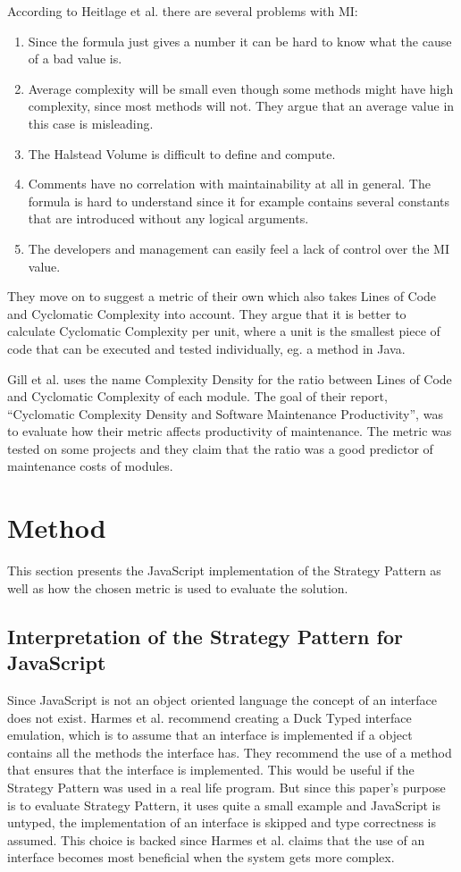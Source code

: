 \documentclass[conference, a4paper]{IEEEtran}
\begin{document}
According to Heitlage et al. there are several problems with MI:
	\begin{enumerate}
		\item Since the formula just gives a number it can be hard to know what the cause of a bad value is.
		\item Average complexity will be small even though some methods might have high complexity, since most methods will not. They argue that an average value in this case is misleading.
		\item The Halstead Volume is difficult to define and compute.
		\item Comments have no correlation with maintainability at all in general. The formula is hard to understand since it for example contains several constants that are introduced without any logical arguments.
		\item The developers and management can easily feel a lack of control over the MI value.
	\end{enumerate}
They move on to suggest a metric of their own which also takes Lines of Code and Cyclomatic Complexity into account. They argue that it is better to calculate Cyclomatic Complexity per unit, where a unit is the smallest piece of code that can be executed and tested individually, eg. a method in Java.~\cite{bibitem:Maintainability}

Gill et al. uses the name Complexity Density for the ratio between Lines of Code and Cyclomatic Complexity of each module. The goal of their report, ``Cyclomatic Complexity Density and Software Maintenance Productivity'', was to evaluate how their metric affects productivity of maintenance. The metric was tested on some projects and they claim that the ratio was a good predictor of maintenance costs of modules.~\cite{bibitem:CCD}

\section{Method}
This section presents the JavaScript implementation of the Strategy Pattern as well as how the chosen metric is used to evaluate the solution.

\subsection{Interpretation of the Strategy Pattern for JavaScript}
\label{sec:JavaScript}
Since JavaScript is not an object oriented language the concept of an interface does not exist. Harmes et al. recommend creating a Duck Typed interface emulation, which is to assume that an interface is implemented if a object contains all the methods the interface has. They recommend the use of a method that ensures that the interface is implemented. This would be useful if the Strategy Pattern was used in a real life program. But since this paper's purpose is to evaluate Strategy Pattern, it uses quite a small example and JavaScript is untyped, the implementation of an interface is skipped and type correctness is assumed. This choice is backed since Harmes et al. claims that the use of an interface becomes most beneficial when the system gets more complex.~\cite{bibitem:DiazHarmes}
\end{document}
